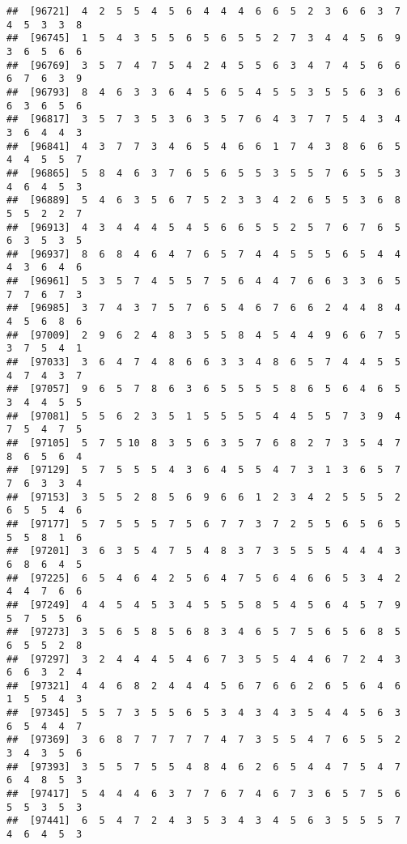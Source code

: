 \documentclass[
]{book}
\begin{document}
\begin{verbatim}
##  [96721]  4  2  5  5  4  5  6  4  4  4  6  6  5  2  3  6  6  3  7  4  5  3  3  8
##  [96745]  1  5  4  3  5  5  6  5  6  5  5  2  7  3  4  4  5  6  9  3  6  5  6  6
##  [96769]  3  5  7  4  7  5  4  2  4  5  5  6  3  4  7  4  5  6  6  6  7  6  3  9
##  [96793]  8  4  6  3  3  6  4  5  6  5  4  5  5  3  5  5  6  3  6  6  3  6  5  6
##  [96817]  3  5  7  3  5  3  6  3  5  7  6  4  3  7  7  5  4  3  4  3  6  4  4  3
##  [96841]  4  3  7  7  3  4  6  5  4  6  6  1  7  4  3  8  6  6  5  4  4  5  5  7
##  [96865]  5  8  4  6  3  7  6  5  6  5  5  3  5  5  7  6  5  5  3  4  6  4  5  3
##  [96889]  5  4  6  3  5  6  7  5  2  3  3  4  2  6  5  5  3  6  8  5  5  2  2  7
##  [96913]  4  3  4  4  4  5  4  5  6  6  5  5  2  5  7  6  7  6  5  6  3  5  3  5
##  [96937]  8  6  8  4  6  4  7  6  5  7  4  4  5  5  5  6  5  4  4  4  3  6  4  6
##  [96961]  5  3  5  7  4  5  5  7  5  6  4  4  7  6  6  3  3  6  5  7  7  6  7  3
##  [96985]  3  7  4  3  7  5  7  6  5  4  6  7  6  6  2  4  4  8  4  4  5  6  8  6
##  [97009]  2  9  6  2  4  8  3  5  5  8  4  5  4  4  9  6  6  7  5  3  7  5  4  1
##  [97033]  3  6  4  7  4  8  6  6  3  3  4  8  6  5  7  4  4  5  5  4  7  4  3  7
##  [97057]  9  6  5  7  8  6  3  6  5  5  5  5  8  6  5  6  4  6  5  3  4  4  5  5
##  [97081]  5  5  6  2  3  5  1  5  5  5  5  4  4  5  5  7  3  9  4  7  5  4  7  5
##  [97105]  5  7  5 10  8  3  5  6  3  5  7  6  8  2  7  3  5  4  7  8  6  5  6  4
##  [97129]  5  7  5  5  5  4  3  6  4  5  5  4  7  3  1  3  6  5  7  7  6  3  3  4
##  [97153]  3  5  5  2  8  5  6  9  6  6  1  2  3  4  2  5  5  5  2  6  5  5  4  6
##  [97177]  5  7  5  5  5  7  5  6  7  7  3  7  2  5  5  6  5  6  5  5  5  8  1  6
##  [97201]  3  6  3  5  4  7  5  4  8  3  7  3  5  5  5  4  4  4  3  6  8  6  4  5
##  [97225]  6  5  4  6  4  2  5  6  4  7  5  6  4  6  6  5  3  4  2  4  4  7  6  6
##  [97249]  4  4  5  4  5  3  4  5  5  5  8  5  4  5  6  4  5  7  9  5  7  5  5  6
##  [97273]  3  5  6  5  8  5  6  8  3  4  6  5  7  5  6  5  6  8  5  6  5  5  2  8
##  [97297]  3  2  4  4  4  5  4  6  7  3  5  5  4  4  6  7  2  4  3  6  6  3  2  4
##  [97321]  4  4  6  8  2  4  4  4  5  6  7  6  6  2  6  5  6  4  6  1  5  5  4  3
##  [97345]  5  5  7  3  5  5  6  5  3  4  3  4  3  5  4  4  5  6  3  6  5  4  4  7
##  [97369]  3  6  8  7  7  7  7  7  4  7  3  5  5  4  7  6  5  5  2  3  4  3  5  6
##  [97393]  3  5  5  7  5  5  4  8  4  6  2  6  5  4  4  7  5  4  7  6  4  8  5  3
##  [97417]  5  4  4  4  6  3  7  7  6  7  4  6  7  3  6  5  7  5  6  5  5  3  5  3
##  [97441]  6  5  4  7  2  4  3  5  3  4  3  4  5  6  3  5  5  5  7  4  6  4  5  3

\end{verbatim}
\end{document}

